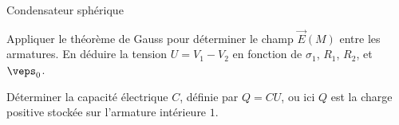 \begin{exo}[PC][2][TD]{Condensateur sphérique}
\begin{quest}
\item Appliquer le théorème de Gauss pour déterminer le champ $\Vec{E}(M)$ entre les armatures. En déduire la tension $U=V_1-V_2$ en fonction de  $\sigma_1$, $R_1$, $R_2$, et $\veps_0$.



\item Déterminer la capacité électrique $C$, définie par $Q = CU$, ou ici $Q$ est la charge positive stockée sur l’armature intérieure $1$.

\end{quest}
\end{exo}


